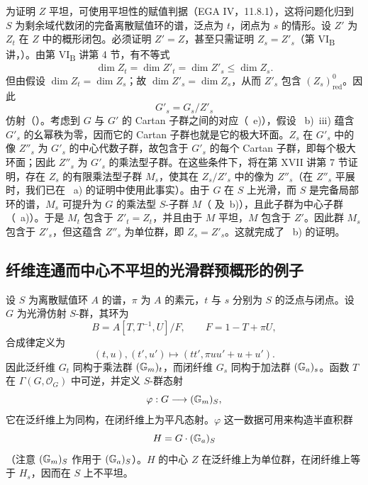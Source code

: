 为证明 \(Z\) 平坦，可使用平坦性的赋值判据（EGA IV，11.8.1），这将问题化归到 \(S\) 为剩余域代数闭的完备离散赋值环的谱，泛点为 \(t\)，闭点为 \(s\) 的情形。设 \(Z'\) 为 \(Z_t\) 在 \(Z\) 中的概形闭包。必须证明 \(Z'=Z\)，甚至只需证明 \(Z_s=Z'_s\)（第 VI\textsubscript{B} 讲，）。由第 VI\textsubscript{B} 讲第 4 节，有不等式
\[
  \dim Z_t=\dim Z'_t=\dim Z'_s\leq \dim Z_s.
\]
但由假设 \(\dim Z_t=\dim Z_s\)；故 \(\dim Z'_s=\dim Z_s\)，从而 \(Z'_s\) 包含 \((Z_s)^0_{\mathrm{red}}\)。因此
\[
  G'_s=G_s/Z'_s
\]
仿射（）。考虑到 \(G\) 与 \(G'\) 的 Cartan 子群之间的对应（~e)），假设 ~b)~iii) 蕴含 \(G'_s\) 的幺幂秩为零，因而它的 Cartan 子群也就是它的极大环面。\(Z_s\) 在 \(G'_s\) 中的像 \(Z''_s\) 为 \(G'_s\) 的中心代数子群，故包含于 \(G'_s\) 的每个 Cartan 子群，即每个极大环面；因此 \(Z''_s\) 为 \(G'_s\) 的乘法型子群。在这些条件下，将在第 XVII 讲第 7 节证明，存在 \(Z_s\) 的有限乘法型子群 \(M_s\)，使其在 \(Z_s/Z'_s\) 中的像为 \(Z''_s\)（在 \(Z''_s\) 平展时，我们已在 ~a) 的证明中使用此事实）。由于 \(G\) 在 \(S\) 上光滑，而 \(S\) 是完备局部环的谱，\(M_s\) 可提升为 \(G\) 的乘法型 \(S\)-子群 \(M\)（ 及~b)），且此子群为中心子群（~a)）。于是 \(M_t\) 包含于 \(Z'_t=Z_t\)，并且由于 \(M\) 平坦，\(M\) 包含于 \(Z'\)。因此群 \(M_s\) 包含于 \(Z'_s\)，但这蕴含 \(Z''_s\) 为单位群，即 \(Z_s=Z'_s\)。这就完成了 ~b) 的证明。

\subsection*{纤维连通而中心不平坦的光滑群预概形的例子}

设 \(S\) 为离散赋值环 \(A\) 的谱，\(\pi\) 为 \(A\) 的素元，\(t\) 与 \(s\) 分别为 \(S\) 的泛点与闭点。设 \(G\) 为光滑仿射 \(S\)-群，其环为
\[
  B=A[T,T^{-1},U]/F,\qquad F=1-T+\pi U,
\]
合成律定义为
\[
  (t,u),(t',u')\longmapsto (tt',\pi uu'+u+u').
\]
因此泛纤维 \(G_t\) 同构于乘法群 \((\mathbb G_m)_t\)，而闭纤维 \(G_s\) 同构于加法群 \((\mathbb G_a)_s\)。函数 \(T\) 在 \(\Gamma(G,\mathcal O_G)\) 中可逆，并定义 \(S\)-群态射
\[
  \varphi:G\longrightarrow(\mathbb G_m)_S,
\]
它在泛纤维上为同构，在闭纤维上为平凡态射。\(\varphi\) 这一数据可用来构造半直积群
\[
  H=G\cdot(\mathbb G_a)_S
\]
（注意 \((\mathbb G_m)_S\) 作用于 \((\mathbb G_a)_S\)）。\(H\) 的中心 \(Z\) 在泛纤维上为单位群，在闭纤维上等于 \(H_s\)，因而在 \(S\) 上不平坦。

